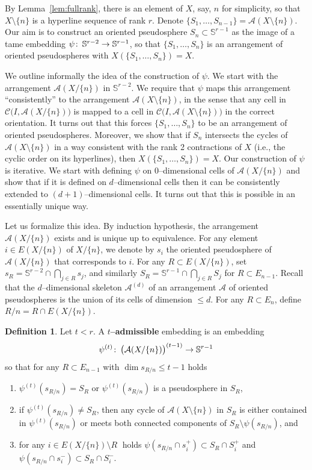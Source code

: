 \documentclass[a4paper]{amsart}
\def\co{\colon\thinspace}
\newcommand{\begriff}[1]{\textbf{#1}}
\newcommand{\p}{\mathbb S}
\theoremstyle{definition}
\newtheorem{definition}{Definition}
\theoremstyle{remark}
\begin{document}
By Lemma~\ref{lem:fullrank}, there is an element of $X$, say, $n$ for
simplicity, so that $X\setminus \{n\}$ is a hyperline sequence of rank
$r$.  
%
Denote  $\{S_1,\dots,S_{n-1}\} = \mathcal A(X\setminus \{n\})$. Our aim 
is to construct an oriented pseudosphere $S_n\subset \p^{r-1}$ as the
image of a tame embedding $\psi\co \p^{r-2}\to \p^{r-1}$, so that 
$\{S_1,\dots,S_n\}$ is an arrangement of oriented pseudospheres with
$X(\{S_1,\dots, S_n\})= X$.

We outline informally the idea of the construction of $\psi$. We start
with the arrangement $\mathcal A(X/\{n\})$ in $\p^{r-2}$. We require
that $\psi$ maps this arrangement ``consistently'' to the arrangement
$\mathcal A(X\setminus \{n\})$, in the sense that any cell in $\mathcal
C\big(I,\mathcal A(X/\{n\})\big)$ is mapped to a cell in $\mathcal
C\big(I,\mathcal A(X\setminus\{n\})\big)$ in the correct orientation. It
turns out that this forces $\{S_1,\dots, S_n\}$ to be an arrangement 
of oriented pseudospheres.
%
Moreover, we show that if $S_n$ intersects the cycles of $\mathcal A(X
\setminus \{n\})$ in a way consistent with the rank 2 contractions of
$X$ (i.e., the cyclic order on its hyperlines),
then $X(\{S_1,\dots, S_n\}) = X$.
%
Our construction of $\psi$ is iterative. We start with defining $\psi$ on
$0$--dimensional cells of $\mathcal A(X/\{n\})$ and show that if it is
defined on $d$--dimensional cells then it can be consistently extended to
$(d+1)$--dimensional cells. It turns out that this is possible in an
essentially unique way.

Let us formalize this idea. 
By induction hypothesis, the arrangement $\mathcal A(X/\{n\})$ exists 
and is unique up to equivalence. For any element $i\in E(X/\{n\})$ of
$X/\{n\}$, we denote by $s_i$ the oriented pseudosphere of $\mathcal
A(X/\{n\})$ that corresponds to $i$.
For any $R\subset E(X/\{n\})$, set $s_R = \p^{r-2}\cap\bigcap_{j\in R}
s_j$, and similarly $S_R = \p^{r-1}\cap \bigcap_{j\in R} S_j$ for
$R\subset E_{n-1}$. 
%
Recall that the $d$--dimensional skeleton
$\mathcal A^{(d)}$ of an arrangement $\mathcal A$ of oriented
pseudospheres is the union of its cells of dimension $\le d$.
For any $R\subset E_n$, define $R/n = R\cap E(X/\{n\})$.

\begin{definition}
  Let $t< r$. A \begriff{$t$--admissible} embedding  is an embedding
  $$\psi^{(t)}\co \big(\mathcal A(X/\{n\})\big)^{(t-1)} \to \p^{r-1}$$
  so that  for any $R\subset E_{n-1}$ with
  $\dim s_{R/n} \le t-1$ holds 
  \begin{enumerate}
  \item $\psi^{(t)}(s_{R/n})=S_R$ or $\psi^{(t)}(s_{R/n})$ is a
    pseudosphere in $S_R$, 
  \item if $\psi^{(t)}(s_{R/n})\not=S_R$, then any cycle of $\mathcal
    A(X \setminus \{n\})$ in $S_R$ is either contained in
    $\psi^{(t)}(s_{R/n})$ or meets both connected components of
    $S_R\setminus \psi(s_{R/n})$, and
  \item for any $i\in E(X/\{n\})\setminus R\;$ holds 
    $\psi(s_{R/n}\cap s_i^+)  \subset S_R\cap S_i^+$ and
    $\psi(s_{R/n}\cap s_i^-) \subset S_R\cap S_i^-$.
  \end{enumerate}
\end{definition}
\end{document}
